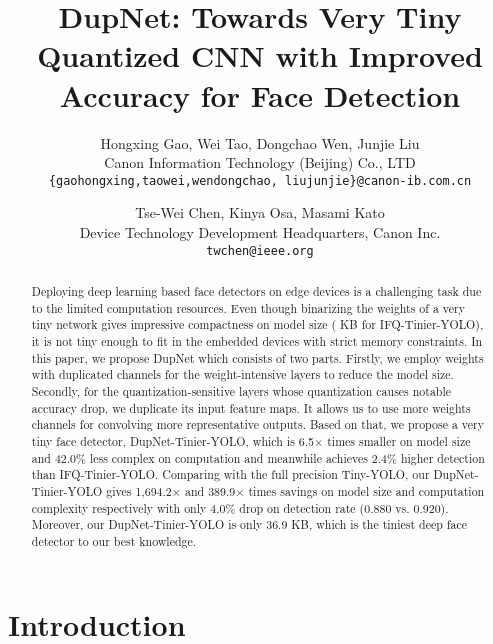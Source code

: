 \documentclass[10pt,twocolumn,letterpaper]{article}
\begin{document}
\title{DupNet: Towards Very Tiny Quantized CNN  with Improved Accuracy for Face Detection}

\author{Hongxing Gao, Wei Tao, Dongchao Wen, Junjie Liu\\
	Canon Information Technology (Beijing) Co., LTD\\
{\tt\small \{gaohongxing,taowei,wendongchao, liujunjie\}@canon-ib.com.cn}
\and
	Tse-Wei Chen, Kinya Osa, Masami Kato\\
	Device Technology Development Headquarters, Canon Inc.\\
{\tt\small twchen@ieee.org}
}

\maketitle

\ifcvprfinal\thispagestyle{empty}\fi

\begin{abstract}
		
Deploying deep learning based face detectors on edge devices is a challenging task due to the limited computation resources. Even though binarizing the weights of a very tiny network gives impressive compactness on model size ( KB for IFQ-Tinier-YOLO), it is not tiny enough to fit in the embedded devices with strict memory constraints. In this paper, we propose DupNet which consists of two parts. Firstly, we employ weights with duplicated channels for the weight-intensive layers to reduce the model size. Secondly, for the quantization-sensitive layers whose quantization causes notable accuracy drop, we duplicate its input feature maps. It allows us to use more weights channels for convolving more representative outputs. Based on that, we propose a very tiny face detector, DupNet-Tinier-YOLO, which is 6.5$\times$ times smaller on model size and 42.0\% less complex on computation and meanwhile achieves 2.4\% higher detection than IFQ-Tinier-YOLO. Comparing with the full precision Tiny-YOLO, our DupNet-Tinier-YOLO gives 1,694.2$\times$ and 389.9$\times$ times savings on model size and computation complexity respectively with only 4.0\% drop on detection rate (0.880 vs. 0.920). Moreover, our DupNet-Tinier-YOLO is only 36.9 KB, which is the tiniest deep face detector to our best knowledge.
	
\end{abstract}

\section{Introduction}\label{sec:intro}
\end{document}
